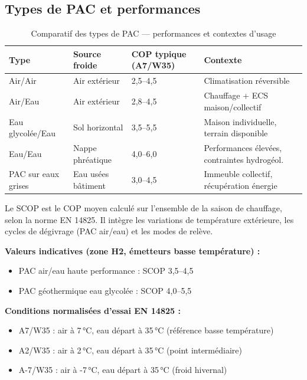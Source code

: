 \subsection{Types de PAC et performances}

\begin{table}[H]
  \centering
  \caption{Comparatif des types de PAC — performances et contextes d'usage}
  \begin{tabular}{p{2.5cm}p{3cm}p{2.5cm}p{4cm}}
    \toprule
    Type & Source froide & COP typique (A7/W35) & Contexte \\
    \midrule
    Air/Air & Air extérieur & 2,5–4,5 & Climatisation réversible \\
    Air/Eau & Air extérieur & 2,8–4,5 & Chauffage + ECS maison/collectif \\
    Eau glycolée/Eau & Sol horizontal & 3,5–5,5 & Maison individuelle, terrain disponible \\
    Eau/Eau & Nappe phréatique & 4,0–6,0 & Performances élevées, contraintes hydrogéol. \\
    PAC sur eaux grises & Eau usées bâtiment & 3,0–4,5 & Immeuble collectif, récupération énergie \\
    \bottomrule
  \end{tabular}
\end{table}

\begin{definition}[title=SCOP (Seasonal COP)]
Le SCOP est le COP moyen calculé sur l'ensemble de la saison de chauffage, selon la norme EN 14825. Il intègre les variations de température extérieure, les cycles de dégivrage (PAC air/eau) et les modes de relève.

\textbf{Valeurs indicatives (zone H2, émetteurs basse température) :}
\begin{itemize}
  \item PAC air/eau haute performance : SCOP 3,5–4,5
  \item PAC géothermique eau glycolée : SCOP 4,0–5,5
\end{itemize}

\textbf{Conditions normalisées d'essai EN 14825 :}
\begin{itemize}
  \item A7/W35 : air à 7\,°C, eau départ à 35\,°C (référence basse température)
  \item A2/W35 : air à 2\,°C, eau départ à 35\,°C (point intermédiaire)
  \item A-7/W35 : air à -7\,°C, eau départ à 35\,°C (froid hivernal)
\end{itemize}
\end{definition}

